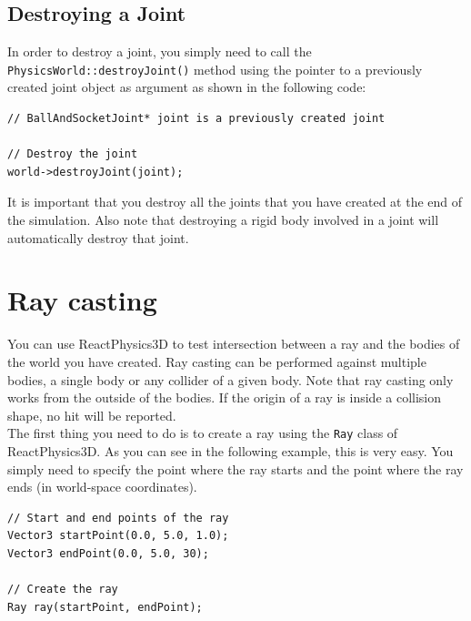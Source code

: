 \documentclass[a4paper,12pt]{article}
\begin{document}
    \subsection{Destroying a Joint}

    \begin{sloppypar}
    In order to destroy a joint, you simply need to call the \texttt{PhysicsWorld::destroyJoint()} method using the pointer to
    a previously created joint object as argument as shown in the following code: \\
   \end{sloppypar}

    \begin{lstlisting}
// BallAndSocketJoint* joint is a previously created joint

// Destroy the joint
world->destroyJoint(joint);
  \end{lstlisting}

    \vspace{0.6cm}

    It is important that you destroy all the joints that you have created at the end of the simulation. Also note that destroying a
    rigid body involved in a joint will automatically destroy that joint.

    \section{Ray casting}
    \label{sec:raycasting}

    You can use ReactPhysics3D to test intersection between a ray and the bodies of the world you have created. Ray casting can be performed against
    multiple bodies, a single body or any collider of a given body. Note that ray casting only works from the outside of the bodies. If the origin
    of a ray is inside a collision shape, no hit will be reported. \\

    The first thing you need to do is to create a ray using the \texttt{Ray} class of ReactPhysics3D. As you can see in the following example, this is
    very easy. You simply need to specify the point where the ray starts and the point where the ray ends (in world-space coordinates). \\

    \begin{lstlisting}
// Start and end points of the ray
Vector3 startPoint(0.0, 5.0, 1.0);
Vector3 endPoint(0.0, 5.0, 30);

// Create the ray
Ray ray(startPoint, endPoint);
  \end{lstlisting}
\end{document}
